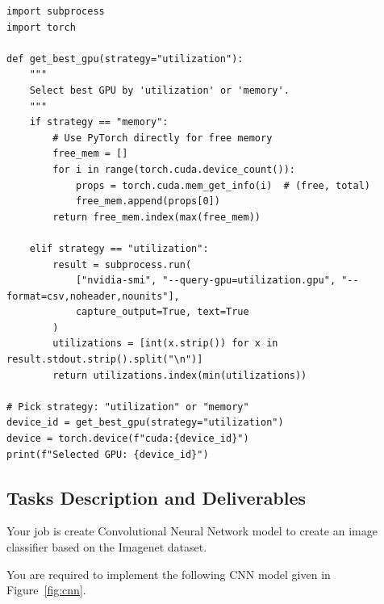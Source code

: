\documentclass[12pt, xcolor=dvipsnames,svgnames,x11names]{article}
\begin{document}
\begin{verbatim}
import subprocess
import torch

def get_best_gpu(strategy="utilization"):
    """
    Select best GPU by 'utilization' or 'memory'.
    """
    if strategy == "memory":
        # Use PyTorch directly for free memory
        free_mem = []
        for i in range(torch.cuda.device_count()):
            props = torch.cuda.mem_get_info(i)  # (free, total)
            free_mem.append(props[0])
        return free_mem.index(max(free_mem))

    elif strategy == "utilization":
        result = subprocess.run(
            ["nvidia-smi", "--query-gpu=utilization.gpu", "--format=csv,noheader,nounits"],
            capture_output=True, text=True
        )
        utilizations = [int(x.strip()) for x in result.stdout.strip().split("\n")]
        return utilizations.index(min(utilizations))

# Pick strategy: "utilization" or "memory"
device_id = get_best_gpu(strategy="utilization")
device = torch.device(f"cuda:{device_id}")
print(f"Selected GPU: {device_id}")
\end{verbatim}


\subsection{Tasks Description and Deliverables}

Your job is create Convolutional Neural Network model to create an image classifier based on the Imagenet dataset.



You are required to implement the following CNN model given in Figure~\ref{fig:cnn}.
\end{document}
